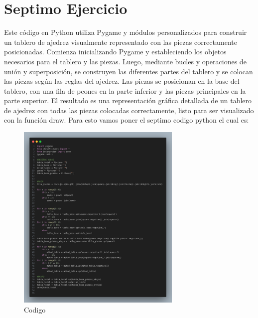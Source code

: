 \documentclass[10pt, a4paper]{article}
\begin{document}
\section{Septimo Ejercicio}
Este código en Python utiliza Pygame y módulos personalizados para construir un tablero de ajedrez visualmente representado con las piezas correctamente posicionadas. Comienza inicializando Pygame y estableciendo los objetos necesarios para el tablero y las piezas. Luego, mediante bucles y operaciones de unión y superposición, se construyen las diferentes partes del tablero y se colocan las piezas según las reglas del ajedrez. Las piezas se posicionan en la base del tablero, con una fila de peones en la parte inferior y las piezas principales en la parte superior. El resultado es una representación gráfica detallada de un tablero de ajedrez con todas las piezas colocadas correctamente, listo para ser visualizado con la función draw.
\singlespacing
Para esto vamos poner el septimo codigo python el cual es:  
\begin{figure}[H]
  \centering
  \includegraphics[width=0.7\textwidth]{img/Ej7.png}
  \caption{Codigo}
\end{figure}
\end{document}
